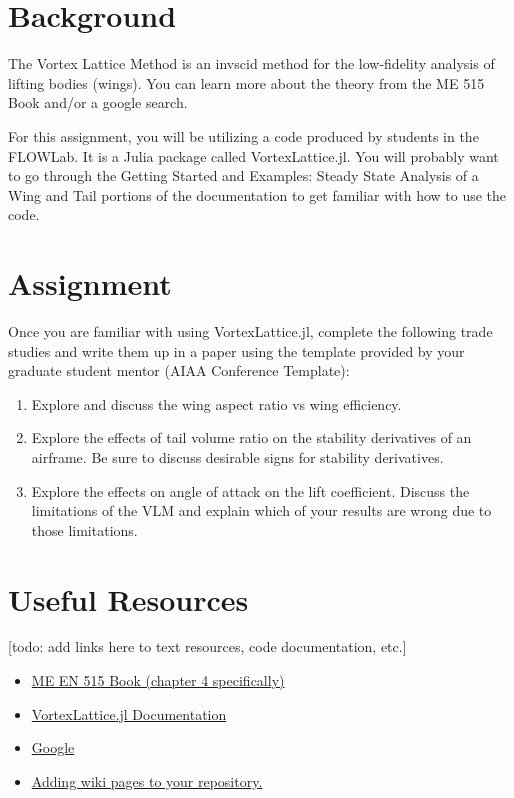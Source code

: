 \documentclass[12pt]{article}
\begin{document}
	
\section{Background}

	The Vortex Lattice Method is an invscid method for the low-fidelity analysis of lifting bodies (wings).
	You can learn more about the theory from the ME 515 Book and/or a google search.
	
	For this assignment, you will be utilizing a code produced by students in the FLOWLab.
	It is a Julia package called VortexLattice.jl.
	You will probably want to go through the Getting Started and Examples: Steady State Analysis of a Wing and Tail portions of the documentation to get familiar with how to use the code.
	
	
\section{Assignment}
	Once you are familiar with using VortexLattice.jl, complete the following trade studies and write them up in a paper using the template provided by your graduate student mentor (AIAA Conference Template):
	
	\begin{enumerate}
		\item Explore and discuss the wing aspect ratio vs wing efficiency. 
		\item Explore the effects of tail volume ratio on the stability derivatives of an airframe. Be sure to discuss desirable signs for stability derivatives.
		\item Explore the effects on angle of attack on the lift coefficient. Discuss the limitations of the VLM and explain which of your results are wrong due to those limitations.
	\end{enumerate}





\section{Useful Resources}

[todo: add links here to text resources, code documentation, etc.]
\begin{itemize}
	\item \href{https://byu.box.com/shared/static/ywfayozbj3sr2ot6b32u8nqk5brqvurt.pdf}{ME EN 515 Book (chapter 4 specifically)}
	\item \href{https://flow.byu.edu/VortexLattice.jl/stable/}{VortexLattice.jl Documentation}
	\item \href{https://letmegooglethat.com/?q=what+is+the+vertical+tail+volume+ratio+formula}{Google}
	\item \href{https://docs.github.com/en/communities/documenting-your-project-with-wikis/adding-or-editing-wiki-pages}{Adding wiki pages to your repository.}
\end{itemize}
\end{document}
